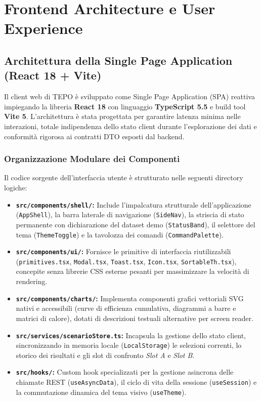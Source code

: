\section{Frontend Architecture e User Experience}
\label{sec:frontend_ux}

\subsection{Architettura della Single Page Application (React 18 + Vite)}
Il client web di TEPO è sviluppato come Single Page Application (SPA) reattiva impiegando la libreria \textbf{React 18} con linguaggio \textbf{TypeScript 5.5} e build tool \textbf{Vite 5}. L'architettura è stata progettata per garantire latenza minima nelle interazioni, totale indipendenza dello stato client durante l'esplorazione dei dati e conformità rigorosa ai contratti DTO esposti dal backend.

\subsubsection{Organizzazione Modulare dei Componenti}
Il codice sorgente dell'interfaccia utente è strutturato nelle seguenti directory logiche:
\begin{itemize}[leftmargin=1.5em, itemsep=0.2em]
    \item \textbf{\texttt{src/components/shell/}:} Include l'impalcatura strutturale dell'applicazione (\texttt{AppShell}), la barra laterale di navigazione (\texttt{SideNav}), la striscia di stato permanente con dichiarazione del dataset demo (\texttt{StatusBand}), il selettore del tema (\texttt{ThemeToggle}) e la tavolozza dei comandi (\texttt{CommandPalette}).
    \item \textbf{\texttt{src/components/ui/}:} Fornisce le primitive di interfaccia riutilizzabili (\texttt{primitives.tsx}, \texttt{Modal.tsx}, \texttt{Toast.tsx}, \texttt{Icon.tsx}, \texttt{SortableTh.tsx}), concepite senza librerie CSS esterne pesanti per massimizzare la velocità di rendering.
    \item \textbf{\texttt{src/components/charts/}:} Implementa componenti grafici vettoriali SVG nativi e accessibili (curve di efficienza cumulativa, diagrammi a barre e matrici di calore), dotati di descrizioni testuali alternative per screen reader.
    \item \textbf{\texttt{src/services/scenarioStore.ts}:} Incapsula la gestione dello stato client, sincronizzando in memoria locale (\texttt{LocalStorage}) le selezioni correnti, lo storico dei risultati e gli slot di confronto \emph{Slot A} e \emph{Slot B}.
    \item \textbf{\texttt{src/hooks/}:} Custom hook specializzati per la gestione asincrona delle chiamate REST (\texttt{useAsyncData}), il ciclo di vita della sessione (\texttt{useSession}) e la commutazione dinamica del tema visivo (\texttt{useTheme}).
\end{itemize}


